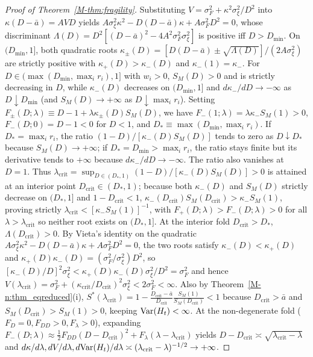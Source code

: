 \documentclass[12pt]{article}
\theoremstyle{definition}
\theoremstyle{remark}
\begin{document}
\begin{proof}[Proof of Theorem~\ref{M-thm:fragility}]
Substituting $V = \sigma_F^2 + \kappa^2 \sigma_\xi^2 / D^2$ into $\kappa(D - \bar{a}) = A V D$ yields $A \sigma_\xi^2 \kappa^2 - D(D - \bar{a})\kappa + A \sigma_F^2 D^2 = 0$, whose discriminant $\Lambda(D) = D^2[(D - \bar{a})^2 - 4 A^2 \sigma_F^2 \sigma_\xi^2]$ is positive iff $D > D_{\min}$. On $(D_{\min}, 1]$, both quadratic roots $\kappa_\pm(D) = [D(D - \bar{a}) \pm \sqrt{\Lambda(D)}]/(2 A \sigma_\xi^2)$ are strictly positive with $\kappa_+(D) > \kappa_-(D)$ and $\kappa_-(1) = \kappa_-$. For $D \in (\max(D_{\min}, \max_i r_i), 1]$ with $w_i > 0$, $S_M(D) > 0$ and is strictly decreasing in $D$, while $\kappa_-(D)$ decreases on $(D_{\min}, 1]$ and $d\kappa_-/dD \to -\infty$ as $D \downarrow D_{\min}$ (and $S_M(D) \to +\infty$ as $D \downarrow \max_i r_i$). Setting $F_\pm(D; \lambda) \equiv D - 1 + \lambda \kappa_\pm(D) S_M(D)$, we have $F_-(1; \lambda) = \lambda \kappa_- S_M(1) > 0$, $F_-(D; 0) = D - 1 < 0$ for $D < 1$, and $D_* \equiv \max(D_{\min}, \max_i r_i)$. If $D_* = \max_i r_i$, the ratio $(1 - D)/[\kappa_-(D)S_M(D)]$ tends to zero as $D \downarrow D_*$ because $S_M(D) \to +\infty$; if $D_* = D_{\min} > \max_i r_i$, the ratio stays finite but its derivative tends to $+\infty$ because $d\kappa_-/dD \to -\infty$. The ratio also vanishes at $D = 1$. Thus $\lambda_{\mathrm{crit}} = \sup_{D \in (D_*, 1)} (1 - D)/[\kappa_-(D) S_M(D)] > 0$ is attained at an interior point $D_{\mathrm{crit}} \in (D_*, 1)$; because both $\kappa_-(D)$ and $S_M(D)$ strictly decrease on $(D_*, 1]$ and $1 - D_{\mathrm{crit}} < 1$, $\kappa_-(D_{\mathrm{crit}}) S_M(D_{\mathrm{crit}}) > \kappa_- S_M(1)$, proving strictly $\lambda_{\mathrm{crit}} < [\kappa_- S_M(1)]^{-1}$, with $F_+(D;\lambda) > F_-(D;\lambda) > 0$ for all $\lambda > \lambda_{\mathrm{crit}}$ so neither root exists on $(D_*, 1]$. At the interior fold $D_{\mathrm{crit}} > D_*$, $\Lambda(D_{\mathrm{crit}}) > 0$. By Vieta's identity on the quadratic $A \sigma_\xi^2 \kappa^2 - D(D-\bar{a})\kappa + A \sigma_F^2 D^2 = 0$, the two roots satisfy $\kappa_-(D) < \kappa_+(D)$ and $\kappa_+(D)\kappa_-(D) = (\sigma_F^2/\sigma_\xi^2) D^2$, so $[\kappa_-(D)/D]^2 \sigma_\xi^2 < \kappa_+(D)\kappa_-(D)\sigma_\xi^2/D^2 = \sigma_F^2$ and hence $V(\lambda_{\mathrm{crit}}) = \sigma_F^2 + (\kappa_{\mathrm{crit}}/D_{\mathrm{crit}})^2 \sigma_\xi^2 < 2\sigma_F^2 < \infty$. Also by Theorem~\ref{M-n:thm_eqreduced}(i), $S^*(\lambda_{\mathrm{crit}}) = 1 - \frac{D_{\mathrm{crit}}-\bar{a}}{D_{\mathrm{crit}}}\frac{S_M(1)}{S_M(D_{\mathrm{crit}})} < 1$ because $D_{\mathrm{crit}} > \bar{a}$ and $S_M(D_{\mathrm{crit}}) > S_M(1) > 0$, keeping $\mathrm{Var}(H_t) < \infty$. At the non-degenerate fold ($F_D = 0, F_{DD} > 0, F_\lambda > 0$), expanding $F_-(D; \lambda) \approx \frac{1}{2} F_{DD}(D - D_{\mathrm{crit}})^2 + F_\lambda(\lambda - \lambda_{\mathrm{crit}})$ yields $D - D_{\mathrm{crit}} \asymp \sqrt{\lambda_{\mathrm{crit}} - \lambda}$ and $d\kappa/d\lambda, dV/d\lambda, d\mathrm{Var}(H_t)/d\lambda \asymp (\lambda_{\mathrm{crit}} - \lambda)^{-1/2} \to +\infty$.
\end{proof}
\end{document}
